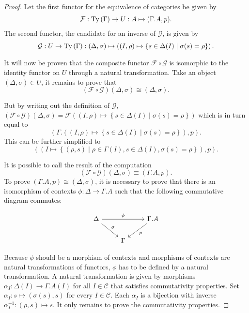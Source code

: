 \documentclass[12pt,a4paper,twoside,xetex]{book}
\begin{document}
\begin{proof}
Let the first functor for the equivalence of categories be given by  
$$\mathcal{F}: \text{Ty}\left(\Gamma\right) \rightarrow  U : A \mapsto (\Gamma . A, p).$$ The 
second functor, the candidate for an inverse of $\mathcal{G}$, is given by  
$$\mathcal{G} : U \rightarrow \text{Ty}\left(\Gamma\right): (\Delta , \sigma) \mapsto \left( 
(I,\rho) \mapsto \left\{ s \in \Delta (I) \mid \sigma (s) = \rho \right\} 
\right).$$ 

It will now be proven that the composite functor $\mathcal{F} \circ 
\mathcal{G}$ is isomorphic to the identity functor on $U$ through a natural 
transformation. Take an object $(\Delta, \sigma) \in U$, it remains to prove 
that $$(\mathcal{F} \circ \mathcal{G})(\Delta , \sigma) \cong (\Delta, 
\sigma).$$ 

But by writing out the definition of $\mathcal{G}$, $(\mathcal{F} 
\circ \mathcal{G})(\Delta , \sigma) = \mathcal{F}((I,\rho) \mapsto \left\{ s 
\in \Delta (I) \mid \sigma (s) = \rho \right\})$ which is in turn equal to 
$$\left(\Gamma . \left((I,\rho) \mapsto \left\{ s \in \Delta (I) \mid \sigma 
(s) = \rho \right\} \right), p \right).$$ This can be further simplified to  $$ 
((I \mapsto  \left\{ (\rho, s ) \mid \rho \in \Gamma (I), s \in \Delta (I), 
\sigma (s) = \rho \right\}), p ).$$

It is possible to call the result of the computation  $$(\mathcal{F} \circ 
\mathcal{G})(\Delta , \sigma) \equiv \left(\Gamma . A, p \right).$$  To prove 
$\left(\Gamma . A, p \right) \cong (\Delta, \sigma)$, it is necessary to prove 
that there is an isomorphism of contexts $\phi : \Delta \rightarrow \Gamma . A$ 
such that the following commutative diagram commutes:

\[ \begin{tikzcd}
\Delta \arrow[dr, "\sigma"] \arrow[rr, "\phi"]
& & \Gamma . A
\arrow[dl, "p"] \\
& \Gamma  %
\end{tikzcd}
\]

Because $\phi$ should be a morphism of contexts and morphisms of contexts are 
natural transformations of functors, $\phi$ has to be defined by a natural 
transformation. A natural transformation is given by morphisms $\alpha_I : 
\Delta(I) \rightarrow \Gamma . A (I)$ for all $I \in \mathcal{C}$ that 
satisfies commutativity properties. Set  $\alpha_I: s \mapsto ( \sigma (s) , 
s)$ for every $I \in \mathcal{C}$. Each $\alpha_I$ is a bijection with inverse 
$\alpha_I^{-1}: (\rho, s) \mapsto s$. It only remains to prove the 
commutativity properties.


\end{proof}
\end{document}

